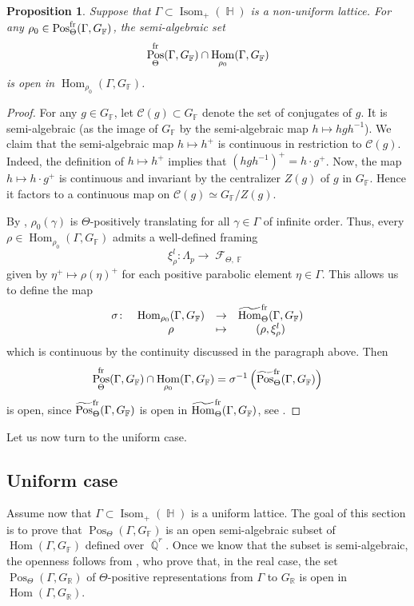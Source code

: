 \documentclass{amsart}
\theoremstyle{plain}
\newtheorem{proposition}{Proposition}[section]
\theoremstyle{definition}
\DeclareMathOperator{\Hom}{Hom}
\DeclareMathOperator{\Isom}{Isom}
\DeclareMathOperator{\Pos}{Pos}
\DeclareMathOperator{\Fc}{\mathcal{F}}
\DeclareMathOperator{\Fb}{{\mathbb{F}}}
\DeclareMathOperator{\Hb}{\mathbb{H}}
\DeclareMathOperator{\Rb}{{\mathbb{R}}}
\DeclareMathOperator{\Qb}{\mathbb{Q}}
\newcommand{\fr}{\textnormal{fr}}
\newcommand{\Qbar}{\overline{\Qb}^r}
\newcommand{\1}{\mathbf{1}}
\begin{document}
\begin{proposition}
\label{propo : open in relative character variety}
    Suppose that $\Gamma\subset\Isom_+(\Hb)$ is a non-uniform lattice. For any $\rho_0\in\Pos_\Theta^{\fr}(\Gamma,G_{\Fb})$, the semi-algebraic set
    \[\Pos_\Theta^{\fr}(\Gamma, G_{\Fb}) \cap \Hom_{\rho_0}(\Gamma,G_{\Fb}) \]
    is open in $\Hom_{\rho_0}(\Gamma,G_{\Fb})$.
\end{proposition}
\begin{proof}
For any $g\in G_{\Fb}$, let $\mathcal C(g)\subset G_{\Fb}$ denote the set of conjugates of $g$.
It is semi-algebraic (as the image of $G_{\Fb}$ by the semi-algebraic map $h\mapsto h g h^{-1}$).
We claim that the semi-algebraic map $h \mapsto h^+$ is continuous in restriction to $\mathcal C(g)$.
Indeed, the definition of $h \mapsto h^+$ implies that $(h g h^{-1})^+ = h \cdot g^+$.
Now, the map $h \mapsto h \cdot g^+$ is continuous and invariant by the centralizer $Z(g)$ of $g$ in $G_{\Fb}$.
Hence it factors to a continuous map on $\mathcal C(g)\simeq G_{\Fb}/Z(g)$.

By , $\rho_0(\gamma)$ is $\Theta$-positively translating for all $\gamma\in\Gamma$ of infinite order.
Thus, every $\rho\in \Hom_{\rho_0}(\Gamma,G_{\Fb})$ admits a well-defined framing 
\[\xi_\rho^l \colon \Lambda_p\to \Fc_{\Theta,\Fb}\]
given by $\eta^+\mapsto\rho(\eta)^+$ for each positive parabolic element $\eta\in \Gamma$. This allows us to define the map 
\[\begin{array}{cccc}
\sigma \colon &\Hom_{\rho_0}(\Gamma, G_{\Fb}) & \to & \widetilde{\Hom}_\Theta^{\fr}(\Gamma, G_{\Fb})\\
& \rho & \mapsto & (\rho, \xi_\rho^l)
\end{array}\]
which is continuous by the continuity discussed in the paragraph above. Then
\[\Pos_\Theta^{\fr}(\Gamma,G_{\Fb}) \cap \Hom_{\rho_0}(\Gamma, G_{\Fb}) = \sigma^{-1} \left(\widetilde{\Pos}_\Theta^{\fr}(\Gamma, G_{\Fb})\right)\]
is open, since $ \widetilde{\Pos}_\Theta^{\fr}(\Gamma, G_{\Fb})$ is open in $\widetilde{\Hom}_\Theta^{\fr}(\Gamma, G_{\Fb})$, see .
\end{proof}

Let us now turn to the uniform case.

\subsection{Uniform case}
Assume now that $\Gamma\subset \Isom_+(\Hb)$ is a uniform lattice.
The goal of this section is to prove that $\Pos_\Theta(\Gamma,G_{\Fb})$ is an open semi-algebraic subset of $\Hom(\Gamma,G_{\Fb})$ defined over $\Qbar$.
Once we know that the subset is semi-algebraic, the openness follows from \cite[Corollary B]{GLW}, who prove that, in the real case, the set $\Pos_\Theta(\Gamma,G_{\Rb})$ of $\Theta$-positive representations from $\Gamma$ to $G_{\Rb}$ is open in $\Hom(\Gamma,G_{\Rb})$.\\
\end{document}
